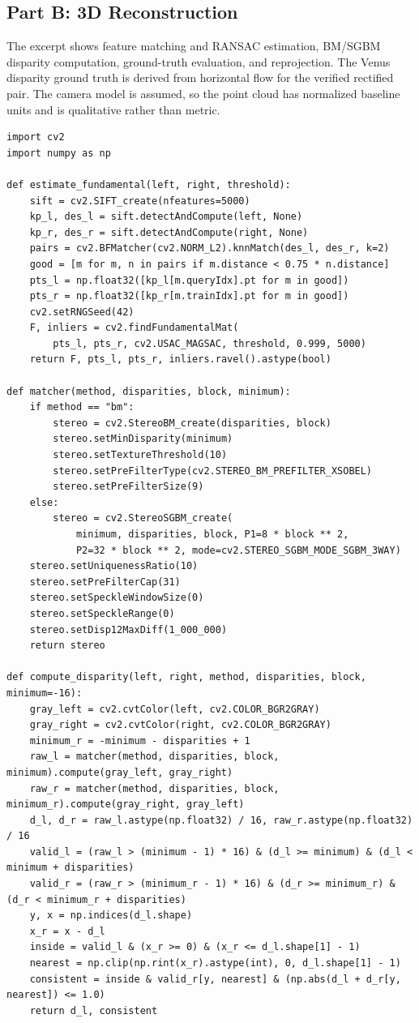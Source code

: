 \documentclass[a4paper,12pt]{article}
\begin{document}
\subsection{Part B: 3D Reconstruction}
The excerpt shows feature matching and RANSAC estimation, BM/SGBM disparity computation, ground-truth evaluation, and reprojection. The Venus disparity ground truth is derived from horizontal flow for the verified rectified pair. The camera model is assumed, so the point cloud has normalized baseline units and is qualitative rather than metric.
\begin{lstlisting}
import cv2
import numpy as np

def estimate_fundamental(left, right, threshold):
    sift = cv2.SIFT_create(nfeatures=5000)
    kp_l, des_l = sift.detectAndCompute(left, None)
    kp_r, des_r = sift.detectAndCompute(right, None)
    pairs = cv2.BFMatcher(cv2.NORM_L2).knnMatch(des_l, des_r, k=2)
    good = [m for m, n in pairs if m.distance < 0.75 * n.distance]
    pts_l = np.float32([kp_l[m.queryIdx].pt for m in good])
    pts_r = np.float32([kp_r[m.trainIdx].pt for m in good])
    cv2.setRNGSeed(42)
    F, inliers = cv2.findFundamentalMat(
        pts_l, pts_r, cv2.USAC_MAGSAC, threshold, 0.999, 5000)
    return F, pts_l, pts_r, inliers.ravel().astype(bool)

def matcher(method, disparities, block, minimum):
    if method == "bm":
        stereo = cv2.StereoBM_create(disparities, block)
        stereo.setMinDisparity(minimum)
        stereo.setTextureThreshold(10)
        stereo.setPreFilterType(cv2.STEREO_BM_PREFILTER_XSOBEL)
        stereo.setPreFilterSize(9)
    else:
        stereo = cv2.StereoSGBM_create(
            minimum, disparities, block, P1=8 * block ** 2,
            P2=32 * block ** 2, mode=cv2.STEREO_SGBM_MODE_SGBM_3WAY)
    stereo.setUniquenessRatio(10)
    stereo.setPreFilterCap(31)
    stereo.setSpeckleWindowSize(0)
    stereo.setSpeckleRange(0)
    stereo.setDisp12MaxDiff(1_000_000)
    return stereo

def compute_disparity(left, right, method, disparities, block, minimum=-16):
    gray_left = cv2.cvtColor(left, cv2.COLOR_BGR2GRAY)
    gray_right = cv2.cvtColor(right, cv2.COLOR_BGR2GRAY)
    minimum_r = -minimum - disparities + 1
    raw_l = matcher(method, disparities, block, minimum).compute(gray_left, gray_right)
    raw_r = matcher(method, disparities, block, minimum_r).compute(gray_right, gray_left)
    d_l, d_r = raw_l.astype(np.float32) / 16, raw_r.astype(np.float32) / 16
    valid_l = (raw_l > (minimum - 1) * 16) & (d_l >= minimum) & (d_l < minimum + disparities)
    valid_r = (raw_r > (minimum_r - 1) * 16) & (d_r >= minimum_r) & (d_r < minimum_r + disparities)
    y, x = np.indices(d_l.shape)
    x_r = x - d_l
    inside = valid_l & (x_r >= 0) & (x_r <= d_l.shape[1] - 1)
    nearest = np.clip(np.rint(x_r).astype(int), 0, d_l.shape[1] - 1)
    consistent = inside & valid_r[y, nearest] & (np.abs(d_l + d_r[y, nearest]) <= 1.0)
    return d_l, consistent


\end{lstlisting}
\end{document}
